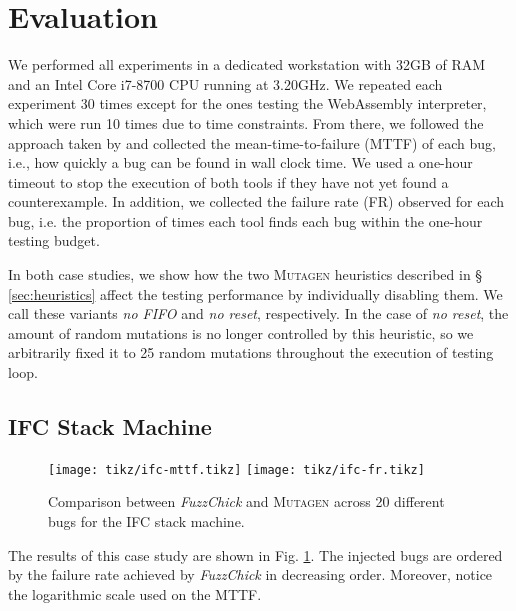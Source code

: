 \documentclass[sigconf, anonymous, review]{acmart}
\newcommand{\fuzzchick}{\textit{FuzzChick}\xspace}
\newcommand{\mutagen}{\textsc{Mutagen}\xspace}
\begin{document}

\section{Evaluation}
\label{sec:evaluation}

We performed all experiments in a dedicated workstation with 32GB of RAM and an
Intel Core i7-8700 CPU running at 3.20GHz.
%
We repeated each experiment 30 times except for the ones testing the WebAssembly
interpreter, which were run 10 times due to time constraints.
%
From there, we followed the approach taken by
\citeauthor{lampropoulos2019coverage} and collected the mean-time-to-failure
(MTTF) of each bug, i.e., how quickly a bug can be found in wall clock time.
%
We used a one-hour timeout to stop the execution of both tools if they have not
yet found a counterexample.
%
In addition, we collected the failure rate (FR) observed for each bug, i.e. the
proportion of times each tool finds each bug within the one-hour testing budget.
%

In both case studies, we show how the two \mutagen heuristics described in \S
\ref{sec:heuristics} affect the testing performance by individually disabling
them.
%
We call these variants \textit{no FIFO} and \textit{no reset}, respectively.
%
In the case of \textit{no reset}, the amount of random mutations is no longer
controlled by this heuristic, so we arbitrarily fixed it to 25 random mutations
throughout the execution of testing loop.

\subsection{IFC Stack Machine}

\begin{figure}[b]
  \centering
  \texttt{[image: tikz/ifc-mttf.tikz]}
  \texttt{[image: tikz/ifc-fr.tikz]}
  \vspace{-20pt}
  \caption{\label{fig:results:ifc} Comparison between \fuzzchick and \mutagen
    across 20 different bugs for the IFC stack machine. }
\vspace{-5pt}
\end{figure}


The results of this case study are shown in Fig. \ref{fig:results:ifc}.
%
%
The injected bugs are ordered by the failure rate achieved by \fuzzchick in
decreasing order.
%
Moreover, notice the logarithmic scale used on the MTTF.
\end{document}
